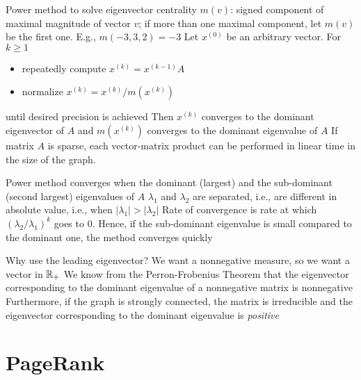 \documentclass[aspectratio=169]{beamer}\usepackage[]{graphicx}\usepackage[]{xcolor}
\begin{document}
\begin{frame}{Power method to solve eigenvector centrality}
$m(v)$: signed component of maximal magnitude of vector $v$; if more than one maximal component, let $m(v)$ be the first one. E.g., $m(-3,3,2) = -3$
\vfill
Let $x^{(0)}$ be an arbitrary vector. For $k \geq 1$
\begin{itemize}
	\item repeatedly compute $x^{(k)} = x^{(k-1)} A$
	\item normalize $x^{(k)} = x^{(k)} / m(x^{(k)})$
\end{itemize}
until desired precision is achieved
\vfill
Then $x^{(k)}$ converges to the dominant eigenvector of $A$ and $m(x^{(k)})$ converges to the dominant eigenvalue of $A$
\vfill
If matrix $A$ is sparse, each vector-matrix product can be performed in linear time in the size of the graph.
\end{frame}


\begin{frame}
Power method converges when the dominant (largest) and the sub-dominant (second largest) eigenvalues of $A$ $\lambda_1$ and $\lambda_2$ are separated, i.e., are different in absolute value, i.e., when $|\lambda_1| > |\lambda_2|$
\vfill
Rate of convergence is rate at which $(\lambda_2 / \lambda_1)^k$ goes to $0$. Hence, if the sub-dominant eigenvalue is small compared to the dominant one, the method converges quickly
\end{frame}


\begin{frame}{Why use the leading eigenvector?}
	We want a nonnegative measure, so we want a vector in $\mathbb{R}_+$
	\vfill
	We know from the Perron-Frobenius Theorem that the eigenvector corresponding to the dominant eigenvalue of a nonnegative matrix is nonnegative
	\vfill
	Furthermore, if the graph is strongly connected, the matrix is irreducible and the eigenvector corresponding to the dominant eigenvalue is \emph{positive}
\end{frame}



\section{PageRank}
\end{document}
